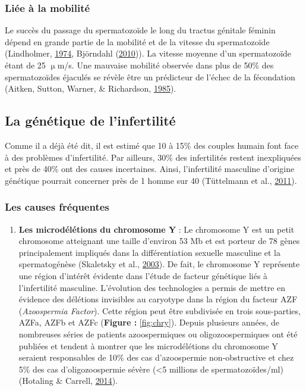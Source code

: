 \documentclass[12pt,twoside]{reedthesis}
\providecommand{\tightlist}{%
  \setlength{\itemsep}{0pt}\setlength{\parskip}{0pt}}
\theoremstyle{definition}
\theoremstyle{definition}
\theoremstyle{remark}
\begin{document}
  \subsubsection{Liée à la mobilité}\label{liee-a-la-mobilite}
  
  Le succès du passage du spermatozoïde le long du tractus génitale
  féminin dépend en grande partie de la mobilité et de la vitesse du
  spermatozoïde (Lindholmer, \protect\hyperlink{ref-Lindholmer1974}{1974},
  Björndahl (\protect\hyperlink{ref-Bjorndahl2010}{2010})). La vitesse
  moyenne d'un spermatozoïde étant de 25 \(\upmu\)m/s. Une mauvaise
  mobilité observée dans plus de 50\% des spermatozoïdes éjaculés se
  révèle être un prédicteur de l'échec de la fécondation (Aitken, Sutton,
  Warner, \& Richardson, \protect\hyperlink{ref-Aitken1985}{1985}).
  
  \subsection{La génétique de
  l'infertilité}\label{la-genetique-de-linfertilite}
  
  Comme il a déjà été dit, il est estimé que 10 à 15\% des couples humain
  font face à des problèmes d'infertilité. Par ailleurs, 30\% des
  infertilités restent inexpliquées et près de 40\% ont des causes
  incertaines. Ainsi, l'infertilité masculine d'origine génétique pourrait
  concerner près de 1 homme sur 40 (Tüttelmann et al.,
  \protect\hyperlink{ref-Tuttelmann2011}{2011}).
  
  \subsubsection{Les causes fréquentes}\label{les-causes-frequentes}
  
  \begin{enumerate}
  \def\labelenumi{\arabic{enumi}.}
  \tightlist
  \item
    \textbf{Les microdélétions du chromosome Y} : Le chromosome Y est un
    petit chromosome atteignant une taille d'environ 53 Mb et est porteur
    de 78 gènes principalement impliqués dans la différentiation sexuelle
    masculine et la spermatogénèse (Skaletsky et al.,
    \protect\hyperlink{ref-Skaletsky2003}{2003}). De fait, le chromosome Y
    représente une région d'intérêt évidente dans l'étude de facteur
    génétique liés à l'infertilité masculine. L'évolution des technologies
    a permis de mettre en évidence des délétions invisibles au caryotype
    dans la région du facteur AZF (\emph{Azoospermia Factor}). Cette
    région peut être subdivisée en trois sous-parties, AZFa, AZFb et AZFc
    (\textbf{Figure :} \ref{fig:chry}). Depuis plusieurs années, de
    nombreuses séries de patients azoospermiques ou oligozoospermiques ont
    été publiées et tendent à montrer que les microdélétions du chromosome
    Y seraient responsables de 10\% des cas d'azoospermie non-obstructive
    et chez 5\% des cas d'oligozoospermie sévère (\textless{}5 millions de
    spermatozoïdes/ml) (Hotaling \& Carrell,
    \protect\hyperlink{ref-Hotaling2014}{2014}).
  \end{enumerate}
  
\end{document}
